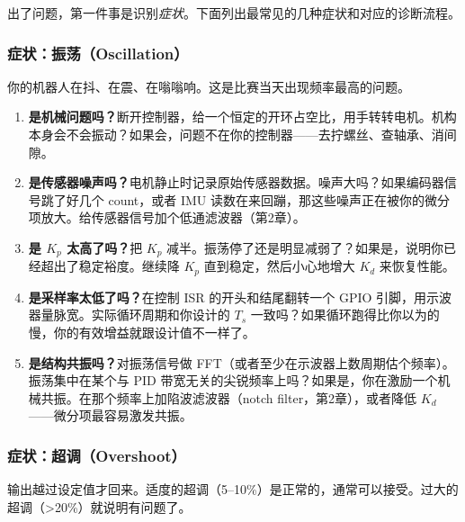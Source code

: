 出了问题，第一件事是识别\textit{症状}。下面列出最常见的几种症状和对应的诊断流程。

\subsubsection{症状：振荡（Oscillation）}

你的机器人在抖、在震、在嗡嗡响。这是比赛当天出现频率最高的问题。

\begin{enumerate}
    \item \textbf{是机械问题吗？}断开控制器，给一个恒定的开环占空比，用手转转电机。机构本身会不会振动？如果会，问题不在你的控制器——去拧螺丝、查轴承、消间隙。

    \item \textbf{是传感器噪声吗？}电机静止时记录原始传感器数据。噪声大吗？如果编码器信号跳了好几个 count，或者 IMU 读数在来回蹦，那这些噪声正在被你的微分项放大。给传感器信号加个低通滤波器（第2章）。

    \item \textbf{是 $K_p$ 太高了吗？}把 $K_p$ 减半。振荡停了还是明显减弱了？如果是，说明你已经超出了稳定裕度。继续降 $K_p$ 直到稳定，然后小心地增大 $K_d$ 来恢复性能。

    \item \textbf{是采样率太低了吗？}在控制 ISR 的开头和结尾翻转一个 GPIO 引脚，用示波器量脉宽。实际循环周期和你设计的 $T_s$ 一致吗？如果循环跑得比你以为的慢，你的有效增益就跟设计值不一样了。

    \item \textbf{是结构共振吗？}对振荡信号做 FFT（或者至少在示波器上数周期估个频率）。振荡集中在某个与 PID 带宽无关的尖锐频率上吗？如果是，你在激励一个机械共振。在那个频率上加陷波滤波器（notch filter，第2章），或者降低 $K_d$——微分项最容易激发共振。
\end{enumerate}

\subsubsection{症状：超调（Overshoot）}

输出越过设定值才回来。适度的超调（5--10\%）是正常的，通常可以接受。过大的超调（>20\%）就说明有问题了。

